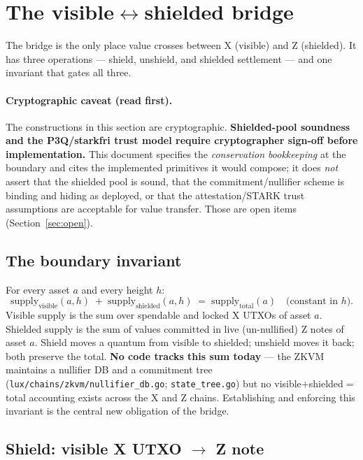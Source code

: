 \section{The visible$\leftrightarrow$shielded bridge}
\label{sec:bridge}

The bridge is the only place value crosses between X (visible) and Z
(shielded). It has three operations --- shield, unshield, and shielded
settlement --- and one invariant that gates all three.

\paragraph{Cryptographic caveat (read first).} The constructions in
this section are cryptographic. \textbf{Shielded-pool soundness and the
P3Q/starkfri trust model require cryptographer sign-off before
implementation.} This document specifies the \emph{conservation
bookkeeping} at the boundary and cites the implemented primitives it
would compose; it does \emph{not} assert that the shielded pool is
sound, that the commitment/nullifier scheme is binding and hiding as
deployed, or that the attestation/STARK trust assumptions are
acceptable for value transfer. Those are open items
(Section~\ref{sec:open}).

\subsection{The boundary invariant}

For every asset $a$ and every height $h$:
\[
  \mathrm{supply}_{\text{visible}}(a,h)
  \;+\;
  \mathrm{supply}_{\text{shielded}}(a,h)
  \;=\;
  \mathrm{supply}_{\text{total}}(a)
  \quad\text{(constant in $h$).}
\]
Visible supply is the sum over spendable and locked X UTXOs of asset
$a$. Shielded supply is the sum of values committed in live (un-nullified)
Z notes of asset $a$. Shield moves a quantum from visible to shielded;
unshield moves it back; both preserve the total. \DESIGN{} \textbf{No
code tracks this sum today} --- the ZKVM maintains a nullifier DB and a
commitment tree (\texttt{lux/chains/zkvm/nullifier\_db.go};
\texttt{state\_tree.go}) but no visible$+$shielded$=$total accounting
exists across the X and Z chains. Establishing and enforcing this
invariant is the central new obligation of the bridge.

\subsection{Shield: visible X UTXO $\to$ Z note}

